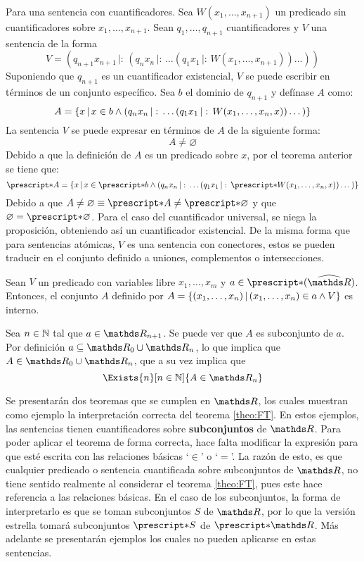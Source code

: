 \begin{demo}
  Para una sentencia con cuantificadores. Sea $W(x_1,\dots,x_{n+1})$ un
  predicado sin cuantificadores sobre $x_1,\dots,x_{n+1}$. Sean
  $q_1,\dots,q_{n+1}$ cuantificadores y $V$ una sentencia de la forma
  \[V=(q_{n+1}x_{n+1}\,|:\,(q_n x_n\,|:\,\dots(q_1x_1\,|:\,W(x_1,\dots,x_{n+1}))\dots))\]
  Suponiendo que $q_{n+1}$ es un cuantificador existencial, $V$ se puede escribir en
  términos de un conjunto específico. Sea $b$ el dominio de $q_{n+1}$ y defínase $A$
  como:
  \[A = \left\{x\,\middle|\,x\in b \land (q_n x_n\,|:\,\dots(q_1x_1\,|:\,W(x_1,\dots,x_n,x))\dots)\right\}\]
  La sentencia $V$ se puede expresar en términos de $A$ de la siguiente forma:
  \[A\not=\varnothing\]
  Debido a que la definición de $A$ es un predicado sobre $x$, por el teorema
  anterior se tiene que:
  \[
    \st{A} =
    \set{x}{
      x\in\st{b} \land
      (q_n x_n\,|:\,\dots(q_1x_1\,|:\,\st{W(x_1,\dots,x_n,x)})\dots)
    }  
  \]
  Debido a que $A\not=\varnothing \equiv \st{A} \not= \st{\varnothing}$ y que
  $\varnothing=\st{\varnothing}$. Para el caso del cuantificador universal, se
  niega la proposición, obteniendo así un cuantificador existencial. De la
  misma forma que para sentencias atómicas, $V$ es una sentencia con conectores,
  estos se pueden traducir en el conjunto definido a uniones, complementos o
  intersecciones.
\end{demo}

\begin{theorem}
  Sean $V$ un predicado con variables libre $x_1,\dots,x_m$ y
  $a\in\st{(\Rh)}$. Entonces, el conjunto $A$ definido por
  $A=\left\{(x_1,\dots,x_n)\,\middle|\,(x_1,\dots,x_n)\in a \land V\right\}$ es interno.
\end{theorem}
\begin{demo}
  Sea $n\in\mathbb{N}$ tal que $a\in\R_{n+1}$. Se puede ver que $A$ es
  subconjunto de $a$. Por definición $a\subseteq \R_0 \cup \R_n$,
  lo que implica que $A\in\R_0\cup\R_n$, que a su vez implica que
  \[\Exists{n}[n\in\N]{A\in\R_n}\]
\end{demo}

Se presentarán dos teoremas que se cumplen en $\R$, los cuales muestran
como ejemplo la interpretación correcta del teorema \ref{theo:FT}.
En estos ejemplos, las sentencias tienen cuantificadores sobre
\textbf{subconjuntos} de $\R$. Para poder aplicar el teorema de forma
correcta, hace falta modificar la expresión para que esté escrita con
las relaciones básicas `$\in$' o `$=$'. La razón de esto, es que cualquier
predicado o sentencia cuantificada sobre subconjuntos de $\R$, no tiene
sentido realmente al considerar el teorema \ref{theo:FT}, pues este hace
referencia a las relaciones básicas. En el caso de los subconjuntos,
la forma de interpretarlo es que se toman subconjuntos $S$ de $\R$, por
lo que la versión estrella tomará subconjuntos $\st{S}$ de $\st{\R}$. Más
adelante se presentarán ejemplos los cuales no pueden aplicarse en
estas sentencias.

